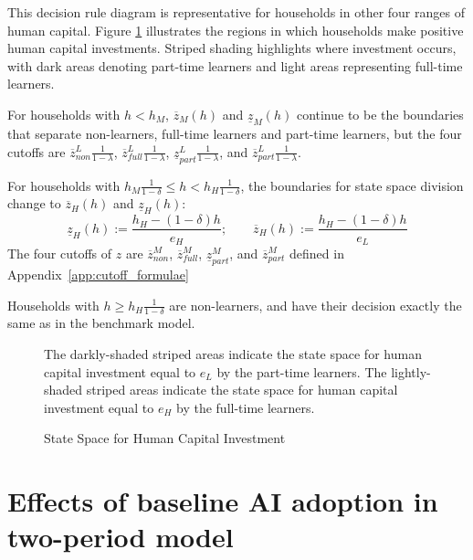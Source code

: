 \documentclass[12pt,english]{article}
\numberwithin{equation}{section}
\begin{document}
{This decision rule diagram is representative for households in other four ranges of human capital. Figure \ref{fig:e-digram_yequalz} illustrates the regions in which households make positive human capital investments. Striped shading highlights where investment occurs, with dark areas denoting part-time learners and light areas representing full-time learners. 

For households with $h<h_M$, $\overline{z}_M(h)$ and $\underline{z}_M(h)$ continue to be the boundaries that separate non-learners, full-time learners and part-time learners, but the four cutoffs are $\overline{z}^L_{non}\frac{1}{1-\lambda}$, $\overline{z}^L_{full}\frac{1}{1-\lambda}$, $\underline{z}^L_{part}\frac{1}{1-\lambda}$, and $\overline{z}^L_{part}\frac{1}{1-\lambda}$.

For households with $h_M\frac{1}{1-\delta} \leq h<h_H\frac{1}{1-\delta}$, the boundaries for state space division change to $\overline{z}_H(h)$ and $\underline{z}_H(h)$:
\begin{equation}\label{eq:zh}
    \underline{z}_H(h):=\frac{h_H-(1-\delta)h}{e_H}; \qquad \overline{z}_H(h):=\frac{h_H-(1-\delta)h}{e_L} 
\end{equation}
The four cutoffs of $z$ are $\overline{z}^M_{non}$, $\overline{z}^M_{full}$, $\underline{z}^M_{part}$, and $\overline{z}^M_{part}$ defined in Appendix~\ref{app:cutoff_formulae}


Households with $h \geq h_H\frac{1}{1-\delta}$ are non-learners, and have their decision exactly the same as in the benchmark model.


\begin{figure}
    \centering
    

\caption{State Space for Human Capital Investment}
\begin{flushleft}
\footnotesize{The darkly-shaded striped areas indicate the state space for human capital investment equal to $e_L$ by the part-time learners. The lightly-shaded striped areas indicate the state space for human capital investment equal to $e_H$ by the full-time learners.} 
\end{flushleft}
    
\label{fig:e-digram_yequalz}
\end{figure}

\section{Effects of baseline AI adoption in two-period model}\label{appsec: AIeffects}

}
\end{document}
